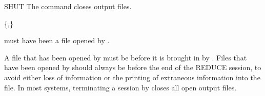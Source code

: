 \begin{Command}{SHUT}
The  command closes output files.
\begin{Syntax}
 \{,\}\optional
\end{Syntax}

 must have been a file opened by .

\begin{Comments}
A file that has been opened by  must be  before it is
brought in by .  Files that have been opened by  should
always be  before the end of the REDUCE session, to avoid either
loss of information or the printing of extraneous information into the file.  
In most systems, terminating a session by  closes all open
output files.
\end{Comments}
\end{Command}


